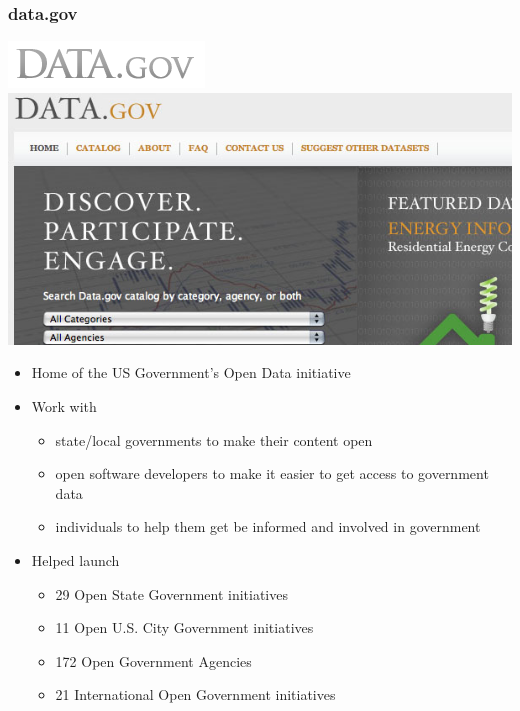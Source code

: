 \documentclass{beamer}
\begin{document}
\begin{frame}
  \frametitle{data.gov}
  \begin{center} \includegraphics[height=0.1\textheight]{../img/data-gov} \hspace{2em} \includegraphics[height=0.2\textheight]{../img/data-gov-site} \end{center}
  
  \begin{itemize}
  \item Home of the US Government's Open Data initiative
  \item Work with
    \begin{itemize}
    \item state/local governments to make their content open
    \item open software developers to make it easier to get access to government data
    \item individuals to help them get be informed and involved in government
    \end{itemize}
  \item Helped launch
    \begin{itemize}
    \item 29 Open State Government initiatives
    \item 11 Open U.S. City Government initiatives
    \item 172 Open Government Agencies
    \item 21 International Open Government initiatives
    \end{itemize}

  \end{itemize}
\end{frame}
\end{document}
